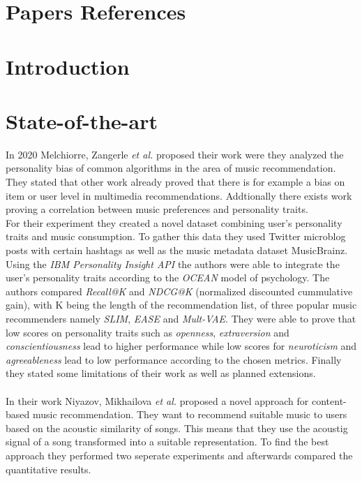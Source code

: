 \documentclass[runningheads,a4paper]{llncs}
\begin{document}
\section{Papers References}
\cite{wang2020came}
\cite{la2022music}


\section{Introduction}

\section{State-of-the-art}
In 2020 Melchiorre, Zangerle \textit{et al.} proposed their work were they analyzed the personality bias of common algorithms in the area of music recommendation.
They stated that other work already proved that there is for example a bias on item or user level in multimedia recommendations. 
Addtionally there exists work proving a correlation between music preferences and personality traits.\\
For their experiment they created a novel dataset combining user's personality traits and music consumption.
To gather this data they used Twitter microblog posts with certain hashtags as well as the music metadata dataset MusicBrainz. 
Using the \textit{IBM Personality Insight API} the authors were able to integrate the user's personality traits according to the \textit{OCEAN} model of psychology.
The authors compared \textit{Recall@K} and \textit{NDCG@K} (normalized discounted cummulative gain), with K being the length of the recommendation list, of three popular music recommenders namely \textit{SLIM}, \textit{EASE} and \textit{Mult-VAE}.
They were able to prove that low scores on personality traits such as \textit{openness}, \textit{extraversion} and \textit{conscientiousness} lead to higher performance
while low scores for \textit{neuroticism} and \textit{agreeableness} lead to low performance according to the chosen metrics. 
Finally they stated some limitations of their work as well as planned extensions. \cite{melchiorre2020personality}\\
\\
In their work Niyazov, Mikhailova \textit{et al.} proposed a novel approach for content-based music recommendation. 
They want to recommend suitable music to users based on the acoustic similarity of songs.
This means that they use the acoustig signal of a song transformed into a suitable representation. 
To find the best approach they performed two seperate experiments and afterwards compared the quantitative results.\\
\end{document}
